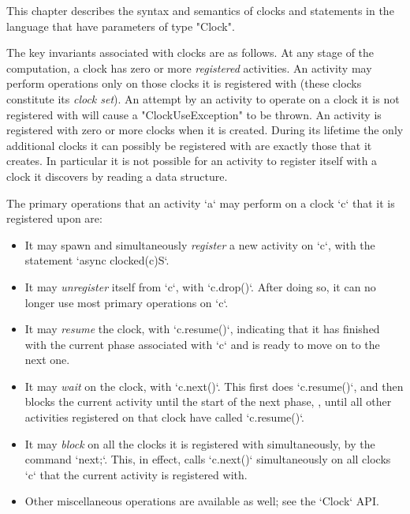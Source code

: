 This chapter describes the syntax and semantics of clocks and
statements in the language that have parameters of type \xcd"Clock". 

The key invariants associated with clocks are as follows.  At any
stage of the computation, a clock has zero or more {\em registered}
activities. An activity may perform operations only on those clocks it
is registered with (these clocks constitute its {\em clock set}). 
An attempt by an activity to operate on a clock it is not registered with
will cause a 
\xcd"ClockUseException"
to be thrown.  
An activity is registered with zero or more clocks when it is created.
During its lifetime the only additional clocks it can possibly be registered with
are exactly those that it creates. In particular it is not possible
for an activity to register itself with a clock it discovers by
reading a data structure.

The primary operations that an activity \xcd`a` may perform on a clock \xcd`c`
that it is registered upon are: 
\begin{itemize}
\item It may spawn and simultaneously  {\em register} a new activity on
      \xcd`c`, with the statement       \xcd`async clocked(c)S`.
\item It may {\em unregister} itself from \xcd`c`, with \xcd`c.drop()`.  After
      doing so, it can no longer use most primary operations on \xcd`c`.
\item It may {\em resume} the clock, with \xcd`c.resume()`, indicating that it
      has finished with the current phase associated with \xcd`c` and is ready
      to move on to the next one.
\item It may {\em wait} on the clock, with \xcd`c.next()`.  This first does
      \xcd`c.resume()`, and then blocks the current activity until the start
      of the next phase, \viz, until all other activities registered on that
      clock have called \xcd`c.resume()`.
\item It may {\em block} on all the clocks it is registered with
      simultaneously, by the command \xcd`next;`.  This, in effect, calls
      \xcd`c.next()` simultaneously 
      on all clocks \xcd`c` that the current activity is registered with.
\item Other miscellaneous operations are available as well; see the
      \xcd`Clock` API.
\end{itemize}

